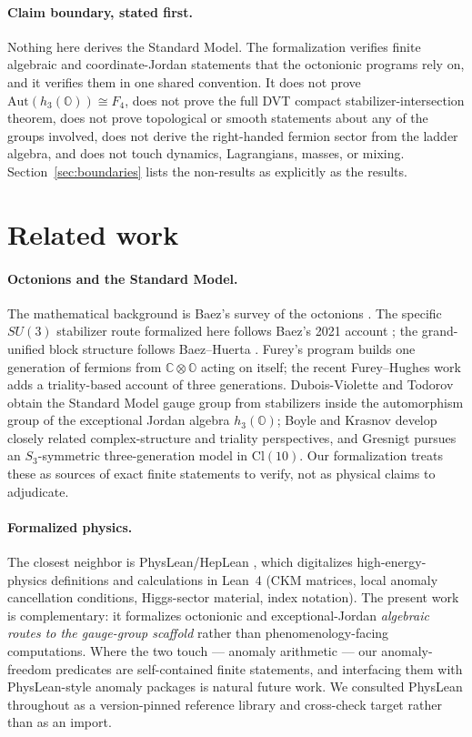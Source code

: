 \documentclass[11pt]{article}
\newcommand{\C}{\mathbb{C}}
\newcommand{\OO}{\mathbb{O}}
\begin{document}
\paragraph{Claim boundary, stated first.}  Nothing here derives the
Standard Model.  The formalization verifies finite algebraic and
coordinate-Jordan statements that the octonionic programs rely on, and it
verifies them in one shared convention.  It does not prove
$\mathrm{Aut}(h_3(\OO)) \cong F_4$, does not prove the full DVT compact
stabilizer-intersection theorem, does not prove topological or smooth
statements about any of the groups involved, does not derive the
right-handed fermion sector from the ladder algebra, and does not touch
dynamics, Lagrangians, masses, or mixing.  Section~\ref{sec:boundaries}
lists the non-results as explicitly as the results.

\section{Related work}
\label{sec:related}

\paragraph{Octonions and the Standard Model.}  The mathematical
background is Baez's survey of the octonions \cite{BaezOctonions}.  The
specific $SU(3)$ stabilizer route formalized here follows Baez's 2021
account \cite{Baez2021}; the grand-unified block structure follows
Baez--Huerta \cite{BaezHuerta2009}.  Furey's program
\cite{Furey2015,Furey2016,Furey2018} builds one generation of fermions
from $\C\otimes\OO$ acting on itself; the recent Furey--Hughes work
\cite{FureyHughes2025} adds a triality-based account of three
generations.  Dubois-Violette and Todorov \cite{DVT2018} obtain the
Standard Model gauge group from stabilizers inside the automorphism group
of the exceptional Jordan algebra $h_3(\OO)$; Boyle \cite{Boyle2020}
and Krasnov \cite{Krasnov2019,Krasnov2025} develop closely related
complex-structure and triality perspectives, and Gresnigt
\cite{Gresnigt2026} pursues an $S_3$-symmetric three-generation model in
$\mathrm{Cl}(10)$.  Our formalization treats these as sources of exact
finite statements to verify, not as physical claims to adjudicate.

\paragraph{Formalized physics.}  The closest neighbor is
PhysLean/HepLean \cite{ToobySmith2025,ToobySmith2024}, which digitalizes
high-energy-physics definitions and calculations in Lean~4 (CKM matrices,
local anomaly cancellation conditions, Higgs-sector material, index
notation).  The present work is complementary: it formalizes octonionic
and exceptional-Jordan \emph{algebraic routes to the gauge-group
scaffold} rather than phenomenology-facing computations.  Where the two
touch --- anomaly arithmetic --- our anomaly-freedom predicates are
self-contained finite statements, and interfacing them with
PhysLean-style anomaly packages is natural future work.  We consulted
PhysLean throughout as a version-pinned reference library and cross-check
target rather than as an import.
\end{document}
